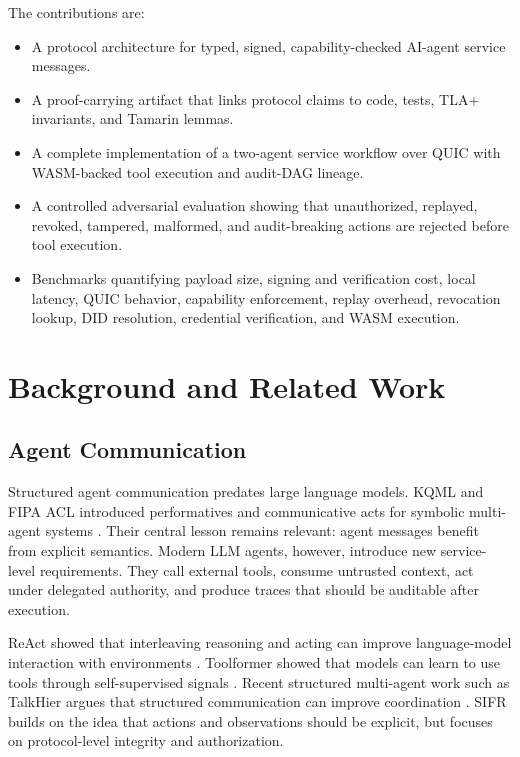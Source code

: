 \documentclass[runningheads]{llncs}
\begin{document}
The contributions are:
\begin{itemize}
  \item A protocol architecture for typed, signed, capability-checked AI-agent service messages.
  \item A proof-carrying artifact that links protocol claims to code, tests, TLA+ invariants, and Tamarin lemmas.
  \item A complete implementation of a two-agent service workflow over QUIC with WASM-backed tool execution and audit-DAG lineage.
  \item A controlled adversarial evaluation showing that unauthorized, replayed, revoked, tampered, malformed, and audit-breaking actions are rejected before tool execution.
  \item Benchmarks quantifying payload size, signing and verification cost, local latency, QUIC behavior, capability enforcement, replay overhead, revocation lookup, DID resolution, credential verification, and WASM execution.
\end{itemize}

\section{Background and Related Work}

\subsection{Agent Communication}

Structured agent communication predates large language models. KQML and FIPA ACL introduced performatives and communicative acts for symbolic multi-agent systems \cite{finin1997kqml,fipa2002aclmessage,fipa2002communicativeacts}. Their central lesson remains relevant: agent messages benefit from explicit semantics. Modern LLM agents, however, introduce new service-level requirements. They call external tools, consume untrusted context, act under delegated authority, and produce traces that should be auditable after execution.

ReAct showed that interleaving reasoning and acting can improve language-model interaction with environments \cite{yao2023react}. Toolformer showed that models can learn to use tools through self-supervised signals \cite{schick2023toolformer}. Recent structured multi-agent work such as TalkHier argues that structured communication can improve coordination \cite{wang2025talkhier}. SIFR builds on the idea that actions and observations should be explicit, but focuses on protocol-level integrity and authorization.
\end{document}
